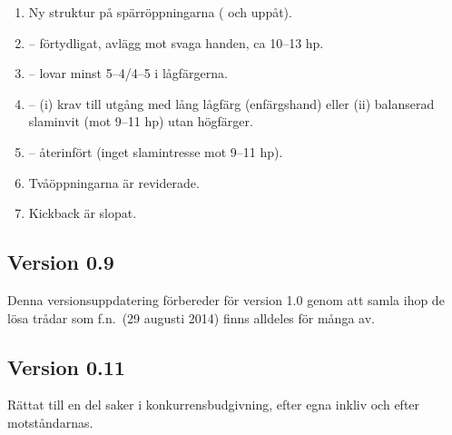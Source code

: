 \begin{enumerate}

\item Ny struktur på spärröppningarna ( och uppåt).

\item {}-- förtydligat, avlägg mot svaga handen, ca 10--13 hp.

\item {}-- lovar minst 5--4/4--5 i lågfärgerna.

\item {}-- (i) krav till utgång med lång lågfärg (enfärgshand)
  eller (ii) balanserad slaminvit (mot 9--11 hp) utan högfärger.

\item {}-- återinfört (inget slamintresse mot 9--11 hp).

\item Tvåöppningarna är reviderade.

\item Kickback är slopat.
\end{enumerate}

\subsection*{Version 0.9}

Denna versionsuppdatering förbereder för version 1.0 genom att samla ihop
de lösa trådar som f.n.\ (29 augusti 2014) finns alldeles för många av.

\subsection*{Version 0.11}

Rättat till en del saker i konkurrensbudgivning, efter egna inkliv och
efter motståndarnas. 
